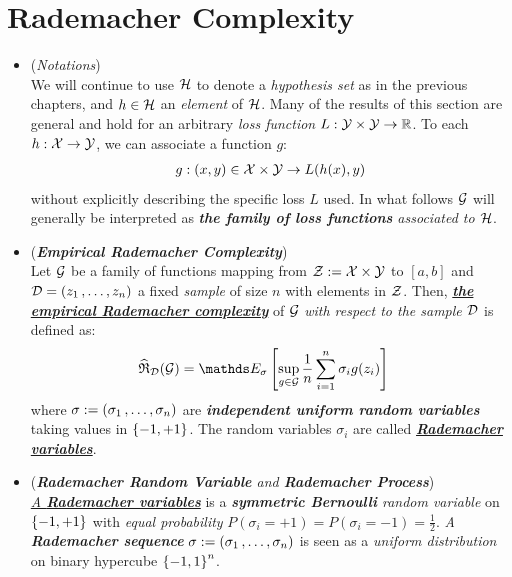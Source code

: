 \documentclass[11pt]{article}
\begin{document}
\section{Rademacher Complexity}
\begin{itemize}
\item \begin{remark} (\emph{Notations})\\
We will continue to use ${\mathcal H}$ to denote a \emph{hypothesis set} as in the previous chapters, and $h \in {\mathcal H}$ an \emph{element} of ${\mathcal H}$. Many of the results of this section are general and hold for an arbitrary \emph{loss function} $L: {\mathcal Y} \times {\mathcal Y} \to {\mathbb R}$. To each $h: {\mathcal X} \to {\mathcal Y}$, we can associate a function $g$:
\begin{align*}
g: (x, y) \in {\mathcal X} \times {\mathcal Y} \to L(h(x), y)
\end{align*} without explicitly describing the specific loss $L$ used. In what follows ${\mathcal G}$ will generally be interpreted as \emph{\textbf{the family of loss functions} associated to ${\mathcal H}$}. 
\end{remark}


\item \begin{definition} (\emph{\textbf{Empirical Rademacher Complexity}})\\
Let ${\mathcal G}$ be a family of functions mapping from ${\mathcal Z} := {\mathcal X} \times {\mathcal Y}$ to $[a, b]$ and ${\mathcal D} = (z_1 \,{,}\ldots{,}\, z_n)$ a fixed \emph{sample} of size $n$ with elements in ${\mathcal Z}$. Then, \underline{\emph{\textbf{the empirical Rademacher complexity}}} of ${\mathcal G}$ \emph{with respect to the sample ${\mathcal D}$} is defined as:
\begin{align}
\widehat{\mathfrak{R}}_{\cD}(\cG)&= \E{\sigma}{\sup_{g \in \cG}\frac{1}{n}\sum_{i=1}^{n}\sigma_{i}g(z_i)}   \label{eqn: rademacher_complexity}
\end{align}
where $\sigma := (\sigma_1 \,{,}\ldots{,}\, \sigma_n)$ are  \textbf{\emph{independent uniform random variables}} taking values in $\left\{-1, +1\right\}$. The random variables $\sigma_i$ are called \underline{\emph{\textbf{Rademacher variables}}}.
\end{definition}

\item \begin{definition}(\emph{\textbf{Rademacher Random Variable} and \textbf{Rademacher Process}})\\
\underline{\emph{A \textbf{Rademacher variables}}} is a \emph{\textbf{symmetric Bernoulli} random variable} on $\left\{-1, +1\right\}$ with \emph{equal probability} $P(\sigma_i = +1) = P(\sigma_i = -1)= \frac{1}{2}$.  \emph{A \textbf{Rademacher sequence}} $\sigma := (\sigma_1 \,{,}\ldots{,}\, \sigma_n)$ is seen as a \emph{uniform distribution} on binary hypercube $\left\{-1, 1\right\}^n$.


\end{definition}
\end{itemize}
\end{document}
